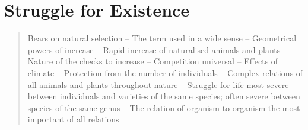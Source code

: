 \chapter{Struggle for Existence}

\begin{quotation}
Bears on natural selection -- The term used in a wide sense -- Geometrical powers of increase -- Rapid increase of naturalised animals and plants -- Nature of the checks to increase -- Competition universal -- Effects of climate -- Protection from the number of individuals -- Complex relations of all animals and plants throughout nature -- Struggle for life most severe between individuals and varieties of the same species; often severe between species of the same genus -- The relation of organism to organism the most important of all relations
\end{quotation}

